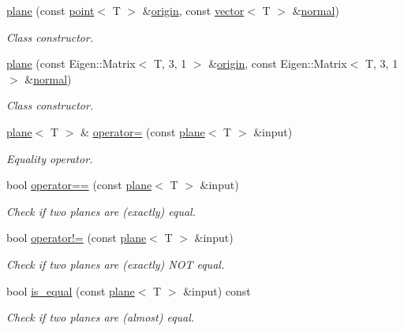 \begin{DoxyCompactItemize}
\hyperlink{classddd_1_1plane_a8b461d0d53aaf84c68875c376e804de3}{plane} (const \hyperlink{classddd_1_1point}{point}$<$ T $>$ \&\hyperlink{classddd_1_1plane_af6a195c3b73a20a3b0a02040b79ada07}{origin}, const \hyperlink{classddd_1_1vector}{vector}$<$ T $>$ \&\hyperlink{classddd_1_1plane_a4d4ef359d3b0e904b5441f4d37fc7220}{normal})
\begin{DoxyCompactList}\small\item\em Class constructor. \end{DoxyCompactList}\item 
\hyperlink{classddd_1_1plane_a7d7d2a60448312343451246052d157c5}{plane} (const Eigen\+::\+Matrix$<$ T, 3, 1 $>$ \&\hyperlink{classddd_1_1plane_af6a195c3b73a20a3b0a02040b79ada07}{origin}, const Eigen\+::\+Matrix$<$ T, 3, 1 $>$ \&\hyperlink{classddd_1_1plane_a4d4ef359d3b0e904b5441f4d37fc7220}{normal})
\begin{DoxyCompactList}\small\item\em Class constructor. \end{DoxyCompactList}\item 
\hyperlink{classddd_1_1plane}{plane}$<$ T $>$ \& \hyperlink{classddd_1_1plane_a4a32afd2bc44926aceccef5de9798945}{operator=} (const \hyperlink{classddd_1_1plane}{plane}$<$ T $>$ \&input)
\begin{DoxyCompactList}\small\item\em Equality operator. \end{DoxyCompactList}\item 
bool \hyperlink{classddd_1_1plane_abca107b7efbe4553cfb980cddb7bbf9a}{operator==} (const \hyperlink{classddd_1_1plane}{plane}$<$ T $>$ \&input)
\begin{DoxyCompactList}\small\item\em Check if two planes are (exactly) equal. \end{DoxyCompactList}\item 
bool \hyperlink{classddd_1_1plane_a0daa9c3444894627380a1174d3721ca9}{operator!=} (const \hyperlink{classddd_1_1plane}{plane}$<$ T $>$ \&input)
\begin{DoxyCompactList}\small\item\em Check if two planes are (exactly) N\+OT equal. \end{DoxyCompactList}\item 
bool \hyperlink{classddd_1_1plane_aa1bb5a0628b0867a39f9484ec6e1f1df}{is\+\_\+equal} (const \hyperlink{classddd_1_1plane}{plane}$<$ T $>$ \&input) const
\begin{DoxyCompactList}\small\item\em Check if two planes are (almost) equal. \end{DoxyCompactList}\item 

\end{DoxyCompactItemize}
